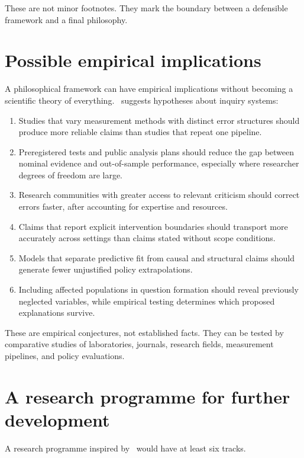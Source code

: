 These are not minor footnotes. They mark the boundary between a defensible
framework and a final philosophy.

\section{Possible empirical implications}

A philosophical framework can have empirical implications without becoming a
scientific theory of everything. \RCR\ suggests hypotheses about inquiry
systems:

\begin{enumerate}
\item Studies that vary measurement methods with distinct error structures
should produce more reliable claims than studies that repeat one pipeline.
\item Preregistered tests and public analysis plans should reduce the gap
between nominal evidence and out-of-sample performance, especially where
researcher degrees of freedom are large.
\item Research communities with greater access to relevant criticism should
correct errors faster, after accounting for expertise and resources.
\item Claims that report explicit intervention boundaries should transport more
accurately across settings than claims stated without scope conditions.
\item Models that separate predictive fit from causal and structural claims
should generate fewer unjustified policy extrapolations.
\item Including affected populations in question formation should reveal
previously neglected variables, while empirical testing determines which
proposed explanations survive.
\end{enumerate}

These are empirical conjectures, not established facts. They can be tested by
comparative studies of laboratories, journals, research fields, measurement
pipelines, and policy evaluations.

\section{A research programme for further development}

A research programme inspired by \RCR\ would have at least six tracks.

